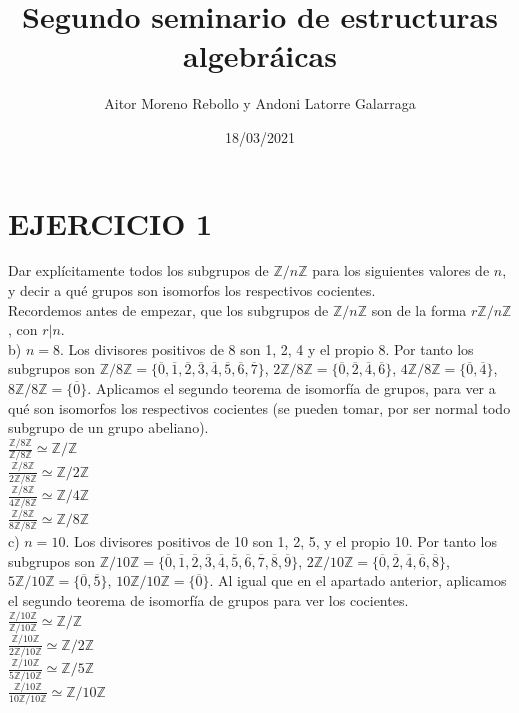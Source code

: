 \documentclass{article}
\title{Segundo seminario de estructuras algebráicas}
\author{Aitor Moreno Rebollo y Andoni Latorre Galarraga}
\date{18/03/2021}
\begin{document}
\setlength{\parindent}{0cm}
\maketitle

\section*{EJERCICIO 1}

Dar explícitamente todos los subgrupos de $\mathbb{Z} / n\mathbb{Z}$ para los siguientes valores de $n$, y decir a qué grupos son isomorfos los respectivos cocientes.\\

Recordemos antes de empezar, que los subgrupos de $ \mathbb{Z} / n\mathbb{Z}$ son de la forma $r \mathbb{Z} / n\mathbb{Z}$, con $r|n$.\\

b) $n = 8$. Los divisores positivos de 8 son 1, 2, 4 y el propio 8. Por tanto los subgrupos son $\mathbb{Z} / 8\mathbb{Z} = \{\overline{0}, \overline{1}, \overline{2},\overline{3}, \overline{4}, \overline{5}, \overline{6}, \overline{7}\}$, $2 \mathbb{Z} / 8\mathbb{Z} = \{\overline{0}, \overline{2}, \overline{4}, \overline{6}\}$, $4 \mathbb{Z} / 8\mathbb{Z} = \{\overline{0}, \overline{4}\}$, $8 \mathbb{Z} / 8\mathbb{Z} = \{\overline{0}\}$. Aplicamos el segundo teorema de isomorfía de grupos, para ver a qué son isomorfos los respectivos cocientes (se pueden tomar, por ser normal todo subgrupo de un grupo abeliano).\\
$\frac{\mathbb{Z} / 8\mathbb{Z}}{\mathbb{Z} / 8\mathbb{Z}} \simeq \mathbb{Z}/\mathbb{Z}$\\
$\frac{\mathbb{Z} / 8\mathbb{Z}}{2\mathbb{Z} / 8\mathbb{Z}} \simeq \mathbb{Z}/2\mathbb{Z}$\\
$\frac{\mathbb{Z} / 8\mathbb{Z}}{4\mathbb{Z} / 8\mathbb{Z}} \simeq \mathbb{Z}/4\mathbb{Z}$\\
$\frac{\mathbb{Z} / 8\mathbb{Z}}{8\mathbb{Z} / 8\mathbb{Z}} \simeq \mathbb{Z}/8\mathbb{Z}$\\

c) $n = 10$. Los divisores positivos de 10 son 1, 2, 5, y el propio 10. Por tanto los subgrupos son $\mathbb{Z} / 10\mathbb{Z} = \{\overline{0}, \overline{1}, \overline{2}, \overline{3}, \overline{4}, \overline{5}, \overline{6}, \overline{7}, \overline{8}, \overline{9}\}$, $2 \mathbb{Z} / 10\mathbb{Z} = \{\overline{0}, \overline{2}, \overline{4}, \overline{6}, \overline{8}\}$, $5 \mathbb{Z} / 10\mathbb{Z} = \{\overline{0}, \overline{5}\}$, $10 \mathbb{Z} / 10\mathbb{Z} = \{\overline{0}\}$. Al igual que en el apartado anterior, aplicamos el segundo teorema de isomorfía de grupos para ver los cocientes.\\
$\frac{\mathbb{Z} / 10\mathbb{Z}}{\mathbb{Z} / 10\mathbb{Z}} \simeq \mathbb{Z}/\mathbb{Z}$\\
$\frac{\mathbb{Z} / 10\mathbb{Z}}{2\mathbb{Z} / 10\mathbb{Z}} \simeq \mathbb{Z}/2\mathbb{Z}$\\
$\frac{\mathbb{Z} / 10\mathbb{Z}}{5\mathbb{Z} / 10\mathbb{Z}} \simeq \mathbb{Z}/5\mathbb{Z}$\\
$\frac{\mathbb{Z} / 10\mathbb{Z}}{10\mathbb{Z} / 10\mathbb{Z}} \simeq \mathbb{Z}/10\mathbb{Z}$\\
\end{document}
